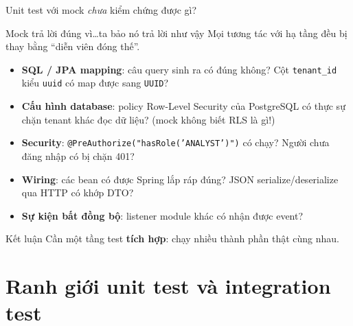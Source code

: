 \documentclass[aspectratio=169,12pt]{beamer}
\begin{document}
\begin{frame}{Unit test với mock \emph{chưa} kiểm chứng được gì?}
  \begin{alertblock}{Mock trả lời đúng vì\ldots ta bảo nó trả lời như vậy}
    Mọi tương tác với hạ tầng đều bị thay bằng ``diễn viên đóng thế''.
  \end{alertblock}
  \begin{itemize}
    \item \textbf{SQL / JPA mapping}: câu query sinh ra có đúng không? Cột
      \texttt{tenant\_id} kiểu \texttt{uuid} có map được sang \texttt{UUID}?
    \item \textbf{Cấu hình database}: policy Row-Level Security của PostgreSQL
      có thực sự chặn tenant khác đọc dữ liệu? (mock không biết RLS là gì!)
    \item \textbf{Security}: \texttt{@PreAuthorize("hasRole('ANALYST')")} có
      chạy? Người chưa đăng nhập có bị chặn 401?
    \item \textbf{Wiring}: các bean có được Spring lắp ráp đúng? JSON
      serialize/deserialize qua HTTP có khớp DTO?
    \item \textbf{Sự kiện bất đồng bộ}: listener module khác có nhận được event?
  \end{itemize}
  \begin{exampleblock}{Kết luận}
    Cần một tầng test \textbf{tích hợp}: chạy nhiều thành phần thật cùng nhau.
  \end{exampleblock}
\end{frame}

\section{Ranh giới unit test và integration test}
\end{document}
